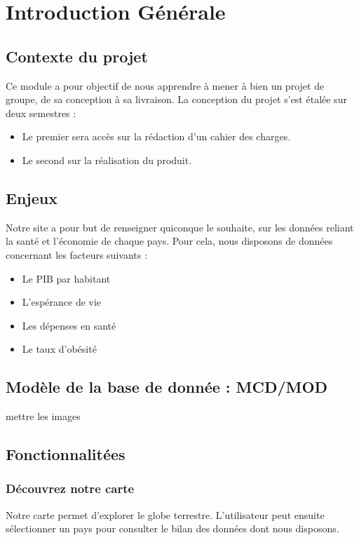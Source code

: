 \documentclass[12pt,a4paper]{report}
\begin{document}
\newpage
    \tableofcontents %


\chapter{Introduction Générale}
\section{Contexte du projet}
	Ce module a pour objectif de nous apprendre à mener à bien un projet de groupe, de sa conception à sa livraison. La conception du projet s'est étalée sur deux semestres :
\begin{itemize}
    \item Le premier sera accès sur la rédaction d'un cahier des charges.
    \item Le second sur la réalisation du produit.
\end{itemize}

\section{Enjeux}
	Notre site a pour but de renseigner quiconque le souhaite, sur les données reliant la santé et l'économie de chaque pays. Pour cela, nous disposons de données concernant les facteurs suivants : 
\begin{itemize}
    \item Le PIB par habitant
    \item L'espérance de vie
    \item Les dépenses en santé
    \item Le taux d'obésité
\end{itemize}	

\section{Modèle de la base de donnée : MCD/MOD}

mettre les images
	
\section{Fonctionnalitées}
\subsection{Découvrez notre carte}
	Notre carte permet d'explorer le globe terrestre. L'utilisateur peut ensuite sélectionner un pays pour consulter le bilan des données dont nous disposons. 
\end{document}
